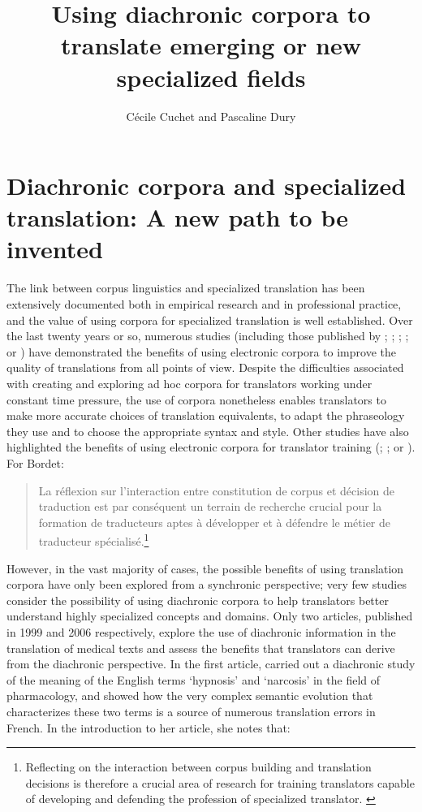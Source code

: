 \documentclass[output=paper]{langscibook}
\author{Cécile Cuchet\orcid{}\affiliation{Université Lumière Lyon2, CeRLA, Centre de Recherche en Linguistique Appliquée} and Pascaline Dury\orcid{}\affiliation{Université Lumière Lyon2, CeRLA, Centre de Recherche en Linguistique Appliquée}}
\title{ {{Using}  {diachronic}  {corpora}  {to}  {translate}  {emerging}  {or}  {new}  {specialized}  {fields}}}
\begin{document}
\maketitle

\section{Diachronic corpora and specialized translation: A new path to be invented}

The link between corpus linguistics and specialized translation has been extensively documented both in empirical research and in professional practice, and the value of using corpora for specialized translation is well established. Over the last twenty years or so, numerous studies (including those published by \citealt{Aston1999}; \citealt{Baker1999}; \citealt{Varantola2002}; \citealt{KüblerAston2010}; \citealt{Kübler2011} or \citealt{Loock2016}) have demonstrated the benefits of using electronic corpora to improve the quality of translations from all points of view. Despite the difficulties associated with creating and exploring ad hoc corpora for translators working under constant time pressure, the use of corpora nonetheless enables translators to make more accurate choices of translation equivalents, to adapt the phraseology they use and to choose the appropriate syntax and style. Other studies have also highlighted the benefits of using electronic corpora for translator training (\citealt{Bowker2003};  \citealt{Rodrígues-InésHurtadoAlbir2012}; or \citealt{KüblerEtAl2018}). For Bordet:
\begin{quote}
La réflexion sur l’interaction entre constitution de corpus et décision de traduction est par conséquent un terrain de recherche crucial pour la formation de traducteurs aptes à développer et à défendre le métier de traducteur spécialisé.\footnote{Reflecting on the interaction between corpus building and translation decisions is therefore a crucial area of research for training translators capable of developing and defending the profession of specialized translator. \citep[13]{Bordet2014}} \citep[13]{Bordet2014}
\end{quote}

However, in the vast majority of cases, the possible benefits of using translation corpora have only been explored from a synchronic perspective; very few studies consider the possibility of using diachronic corpora to help translators better understand highly specialized concepts and domains. Only two articles, published in 1999 and 2006 respectively, explore the use of diachronic information in the translation of medical texts and assess the benefits that translators can derive from the diachronic perspective. In the first article, \citet{Vandaele1999} carried out a diachronic study of the meaning of the English terms ‘hypnosis’ and ‘narcosis’ in the field of pharmacology, and showed how the very complex semantic evolution that characterizes these two terms is a source of numerous translation errors in French. In the introduction to her article, she notes that:
\end{document}
